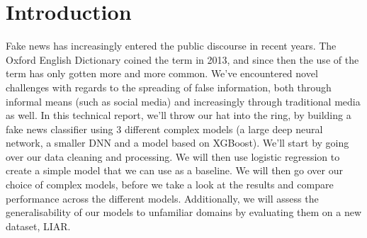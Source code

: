 \section*{Introduction}
Fake news has increasingly entered the public discourse in recent years. The Oxford English Dictionary coined the term
in 2013, and since then the use of the term has only gotten more and more common. We've encountered
novel challenges with regards to the spreading of false information, both through informal means (such as social media)
and increasingly through traditional media as well. In this technical report, we'll throw our hat
into the ring, by building a fake news classifier using 3 different complex models (a large deep neural network, a
smaller DNN and a model based on XGBoost). We'll start by going over our
data cleaning and processing. We will then use logistic regression to create a simple model that we can use as a
baseline. We will then go over our choice of complex models, before we take a look at the results and compare
performance across the different models. Additionally, we will assess the generalisability of our models to unfamiliar domains by evaluating them on a new dataset, LIAR.
